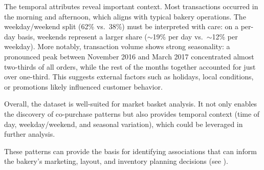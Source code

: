The temporal attributes reveal important context.  
Most transactions occurred in the morning and afternoon, which aligns with 
typical bakery operations.  
The weekday/weekend split (62\% vs.\ 38\%) must be interpreted with care: 
on a per-day basis, weekends represent a larger share 
($\sim$19\% per day vs.\ $\sim$12\% per weekday).  
More notably, transaction volume shows strong seasonality: 
a pronounced peak between November 2016 and March 2017 
concentrated almost two-thirds of all orders, 
while the rest of the months together accounted for just over one-third.  
This suggests external factors such as holidays, local conditions, 
or promotions likely influenced customer behavior.  

Overall, the dataset is well-suited for market basket analysis.  
It not only enables the discovery of co-purchase patterns 
but also provides temporal context (time of day, weekday/weekend, 
and seasonal variation), which could be leveraged in further analysis. 

These patterns can provide the basis for identifying associations that can inform 
the bakery's marketing, layout, and inventory planning decisions 
(see ).
